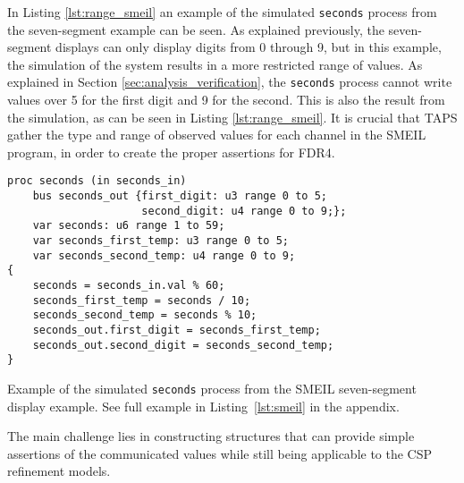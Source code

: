 In Listing \ref{lst:range_smeil} an example of the simulated \texttt{seconds} process from the seven-segment example can be seen. As explained previously, the seven-segment displays can only display digits from 0 through 9, but in this example, the simulation of the system results in a more restricted range of values. As explained in Section \ref{sec:analysis_verification}, the \texttt{seconds} process cannot write values over 5 for the first digit and 9 for the second. This is also the result from the simulation, as can be seen in Listing \ref{lst:range_smeil}. It is crucial that TAPS gather the type and range of observed values for each channel in the SMEIL program, in order to create the proper assertions for FDR4.\\
\begin{listing}
\begin{verbatim}
proc seconds (in seconds_in)
    bus seconds_out {first_digit: u3 range 0 to 5;
                     second_digit: u4 range 0 to 9;};
    var seconds: u6 range 1 to 59;
    var seconds_first_temp: u3 range 0 to 5;
    var seconds_second_temp: u4 range 0 to 9;
{
    seconds = seconds_in.val % 60;
    seconds_first_temp = seconds / 10;
    seconds_second_temp = seconds % 10;
    seconds_out.first_digit = seconds_first_temp;
    seconds_out.second_digit = seconds_second_temp;
}
\end{verbatim}
\caption{Example of the simulated \texttt{seconds} process from the SMEIL seven-segment display example. See full example in Listing~\ref{lst:smeil} in the appendix.}
\label{lst:range_smeil}
\end{listing}

The main challenge lies in constructing \cspm{} structures that can provide simple assertions of the communicated values while still being applicable to the CSP refinement models.

